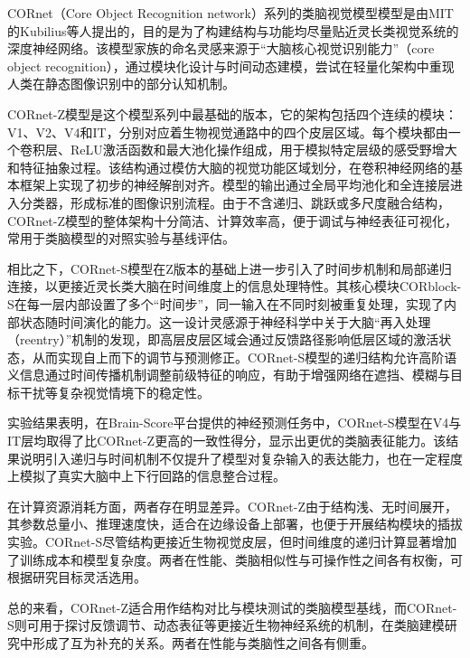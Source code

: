CORnet（Core Object Recognition network）系列的类脑视觉模型模型是由MIT的Kubilius等人提出的，目的是为了构建结构与功能均尽量贴近灵长类视觉系统的深度神经网络。该模型家族的命名灵感来源于“大脑核心视觉识别能力”（core object recognition），通过模块化设计与时间动态建模，尝试在轻量化架构中重现人类在静态图像识别中的部分认知机制\cite{kubilius2019brain}。

CORnet-Z模型是这个模型系列中最基础的版本，它的架构包括四个连续的模块：V1、V2、V4和IT，分别对应着生物视觉通路中的四个皮层区域。每个模块都由一个卷积层、ReLU激活函数和最大池化操作组成，用于模拟特定层级的感受野增大和特征抽象过程。该结构通过模仿大脑的视觉功能区域划分，在卷积神经网络的基本框架上实现了初步的神经解剖对齐。模型的输出通过全局平均池化和全连接层进入分类器，形成标准的图像识别流程。由于不含递归、跳跃或多尺度融合结构，CORnet-Z模型的整体架构十分简洁、计算效率高，便于调试与神经表征可视化，常用于类脑模型的对照实验与基线评估。

相比之下，CORnet-S模型在Z版本的基础上进一步引入了时间步机制和局部递归连接，以更接近灵长类大脑在时间维度上的信息处理特性。其核心模块CORblock-S在每一层内部设置了多个“时间步”，同一输入在不同时刻被重复处理，实现了内部状态随时间演化的能力。这一设计灵感源于神经科学中关于大脑“再入处理（reentry）”机制的发现，即高层皮层区域会通过反馈路径影响低层区域的激活状态，从而实现自上而下的调节与预测修正\cite{kar2019evidence}。CORnet-S模型的递归结构允许高阶语义信息通过时间传播机制调整前级特征的响应，有助于增强网络在遮挡、模糊与目标干扰等复杂视觉情境下的稳定性。

实验结果表明，在Brain-Score平台提供的神经预测任务中，CORnet-S模型在V4与IT层均取得了比CORnet-Z更高的一致性得分，显示出更优的类脑表征能力\cite{kubilius2019brain}。该结果说明引入递归与时间机制不仅提升了模型对复杂输入的表达能力，也在一定程度上模拟了真实大脑中上下行回路的信息整合过程。

在计算资源消耗方面，两者存在明显差异。CORnet-Z由于结构浅、无时间展开，其参数总量小、推理速度快，适合在边缘设备上部署，也便于开展结构模块的插拔实验。CORnet-S尽管结构更接近生物视觉皮层，但时间维度的递归计算显著增加了训练成本和模型复杂度。两者在性能、类脑相似性与可操作性之间各有权衡，可根据研究目标灵活选用。

总的来看，CORnet-Z适合用作结构对比与模块测试的类脑模型基线，而CORnet-S则可用于探讨反馈调节、动态表征等更接近生物神经系统的机制，在类脑建模研究中形成了互为补充的关系。两者在性能与类脑性之间各有侧重。

